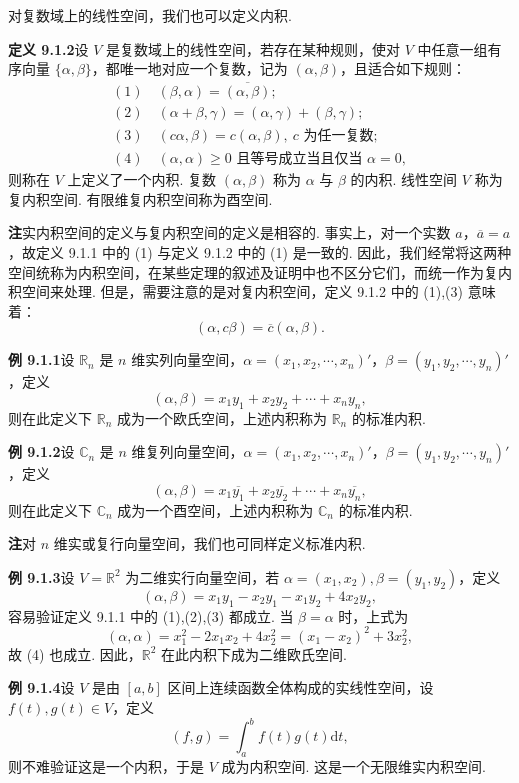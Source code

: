 \documentclass[UTF8, 12pt, fontset=fandol, oneside]{ctexart}
\begin{document}
对复数域上的线性空间，我们也可以定义内积.

\noindent\textbf{定义 9.1.2}\quad 设 $V$ 是复数域上的线性空间，若存在某种规则，使对 $V$ 中任意一组有序向量 $\{\alpha,\beta\}$，都唯一地对应一个复数，记为 $(\alpha,\beta)$，且适合如下规则：
\[
\begin{gathered}
  (1)\quad (\beta,\alpha)=\overline{(\alpha,\beta)};\\
  (2)\quad (\alpha+\beta,\gamma)=(\alpha,\gamma)+(\beta,\gamma);\\
  (3)\quad (c\alpha,\beta)=c(\alpha,\beta),\ c\text{ 为任一复数};\\
  (4)\quad (\alpha,\alpha)\ge0\text{ 且等号成立当且仅当 }\alpha=0,
\end{gathered}
\]
则称在 $V$ 上定义了一个内积. 复数 $(\alpha,\beta)$ 称为 $\alpha$ 与 $\beta$ 的内积. 线性空间 $V$ 称为复内积空间. 有限维复内积空间称为酉空间.

\noindent\textbf{注}\quad 实内积空间的定义与复内积空间的定义是相容的. 事实上，对一个实数 $a$，$\overline a=a$，故定义 9.1.1 中的 (1) 与定义 9.1.2 中的 (1) 是一致的. 因此，我们经常将这两种空间统称为内积空间，在某些定理的叙述及证明中也不区分它们，而统一作为复内积空间来处理. 但是，需要注意的是对复内积空间，定义 9.1.2 中的 (1),(3) 意味着：
\[
  (\alpha,c\beta)=\overline c(\alpha,\beta).
\]

\noindent\textbf{例 9.1.1}\quad 设 $\mathbb R_n$ 是 $n$ 维实列向量空间，$\alpha=(x_1,x_2,\cdots,x_n)'$，$\beta=(y_1,y_2,\cdots,y_n)'$，定义
\[
  (\alpha,\beta)=x_1y_1+x_2y_2+\cdots+x_ny_n,
\]
则在此定义下 $\mathbb R_n$ 成为一个欧氏空间，上述内积称为 $\mathbb R_n$ 的标准内积.

\noindent\textbf{例 9.1.2}\quad 设 $\mathbb C_n$ 是 $n$ 维复列向量空间，$\alpha=(x_1,x_2,\cdots,x_n)'$，$\beta=(y_1,y_2,\cdots,y_n)'$，定义
\[
  (\alpha,\beta)=x_1\overline{y_1}+x_2\overline{y_2}+\cdots+x_n\overline{y_n},
\]
则在此定义下 $\mathbb C_n$ 成为一个酉空间，上述内积称为 $\mathbb C_n$ 的标准内积.

\noindent\textbf{注}\quad 对 $n$ 维实或复行向量空间，我们也可同样定义标准内积.

\noindent\textbf{例 9.1.3}\quad 设 $V=\mathbb R^2$ 为二维实行向量空间，若 $\alpha=(x_1,x_2),\beta=(y_1,y_2)$，定义
\[
  (\alpha,\beta)=x_1y_1-x_2y_1-x_1y_2+4x_2y_2,
\]
容易验证定义 9.1.1 中的 (1),(2),(3) 都成立. 当 $\beta=\alpha$ 时，上式为
\[
  (\alpha,\alpha)=x_1^2-2x_1x_2+4x_2^2=(x_1-x_2)^2+3x_2^2,
\]
故 (4) 也成立. 因此，$\mathbb R^2$ 在此内积下成为二维欧氏空间.

\noindent\textbf{例 9.1.4}\quad 设 $V$ 是由 $[a,b]$ 区间上连续函数全体构成的实线性空间，设 $f(t),g(t)\in V$，定义
\[
  (f,g)=\int_a^b f(t)g(t)\mathrm dt,
\]
则不难验证这是一个内积，于是 $V$ 成为内积空间. 这是一个无限维实内积空间.
\end{document}
